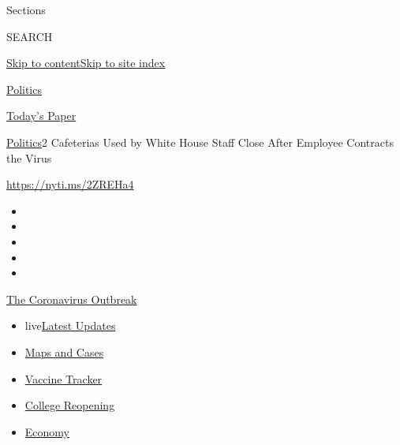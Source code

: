 Sections

SEARCH

\protect\hyperlink{site-content}{Skip to
content}\protect\hyperlink{site-index}{Skip to site index}

\href{https://www.nytimes.com/section/politics}{Politics}

\href{https://myaccount.nytimes.com/auth/login?response_type=cookie\&client_id=vi}{}

\href{https://www.nytimes.com/section/todayspaper}{Today's Paper}

\href{/section/politics}{Politics}\textbar{}2 Cafeterias Used by White
House Staff Close After Employee Contracts the Virus

\url{https://nyti.ms/2ZREHa4}

\begin{itemize}
\item
\item
\item
\item
\item
\end{itemize}

\href{https://www.nytimes.com/news-event/coronavirus?action=click\&pgtype=Article\&state=default\&region=TOP_BANNER\&context=storylines_menu}{The
Coronavirus Outbreak}

\begin{itemize}
\tightlist
\item
  live\href{https://www.nytimes.com/2020/08/03/world/coronavirus-covid-19.html?action=click\&pgtype=Article\&state=default\&region=TOP_BANNER\&context=storylines_menu}{Latest
  Updates}
\item
  \href{https://www.nytimes.com/interactive/2020/us/coronavirus-us-cases.html?action=click\&pgtype=Article\&state=default\&region=TOP_BANNER\&context=storylines_menu}{Maps
  and Cases}
\item
  \href{https://www.nytimes.com/interactive/2020/science/coronavirus-vaccine-tracker.html?action=click\&pgtype=Article\&state=default\&region=TOP_BANNER\&context=storylines_menu}{Vaccine
  Tracker}
\item
  \href{https://www.nytimes.com/2020/08/02/us/covid-college-reopening.html?action=click\&pgtype=Article\&state=default\&region=TOP_BANNER\&context=storylines_menu}{College
  Reopening}
\item
  \href{https://www.nytimes.com/live/2020/08/03/business/stock-market-today-coronavirus?action=click\&pgtype=Article\&state=default\&region=TOP_BANNER\&context=storylines_menu}{Economy}
\end{itemize}

